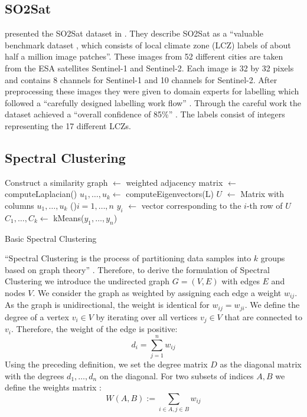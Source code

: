 \subsection{SO2Sat}
\label{subsec:so2sat}
\citeauthor{zhu_so2sat_2019} presented the SO2Sat dataset in \cite{zhu_so2sat_2019}.
They describe SO2Sat as a \enquote{valuable benchmark dataset \textelp{}, which consists of local climate zone (LCZ) labels of about half a million \textelp{} image patches}.
These images from 52 different cities are taken from the ESA satellites Sentinel-1 and Sentinel-2. Each image is 32 by 32 pixels and contains 8 channels for Sentinel-1 and 10 channels for Sentinel-2.
After preprocessing these images they were given to domain experts for labelling which followed a \enquote{carefully designed labelling work flow} \cite{zhu_so2sat_2019}.
Through the careful work the dataset achieved a \enquote{overall confidence of 85\%} \cite{zhu_so2sat_2019}.
The labels consist of integers representing the 17 different \glspl{LCZ}.

\subsection{Spectral Clustering}
\label{subsec:spectral_clustering}

\begin{algorithm}[b]
  Construct a similarity graph\;
  \Adj \(\leftarrow\) weighted adjacency matrix\;
  \Laplace \(\leftarrow\) computeLaplacian(\Adj)\;
  \(u_1, \ldots, u_k \leftarrow\) computeEigenvectors(L)\;
  \(U\) \(\leftarrow\) Matrix with columns \(u_1, \ldots, u_k\)\;
  \ForEach(){\(i = 1, \ldots, n\)}{
    \(y_i\) \(\leftarrow\) vector corresponding to the \(i\)-th row of \(U\)
  }
\(C_1, \ldots, C_k \leftarrow\) kMeans(\(y_1, \ldots, y_n\))\;

  \caption{Basic Spectral Clustering}\label{alg:basic_spectral}
 \end{algorithm}

\enquote{Spectral Clustering is the process of partitioning data samples into
\(k\) groups based on graph theory} \cite{krajsek_helmholtz_nodate}. Therefore,
to derive the formulation of Spectral Clustering we introduce the undirected graph \(G=(V, E)\) with edges \(E\) and nodes \(V\).
We consider the graph as weighted by assigning each edge a weight \(w_{ij}\). As the graph
is unidirectional, the weight is identical for \(w_{ij} = w_{ji} \).
We define the degree of a vertex \(v_i \in V\) by iterating over all vertices \(v_j \in V\) that are connected to \(v_i\).
Therefore, the weight of the edge is positive:
\[d_i = \sum_{j=1}^n w_{ij}\]
Using the preceding definition, we set the degree matrix \(D\) as the diagonal matrix with the degrees \(d_1, \ldots, d_n\) on the diagonal.
\cite{von_luxburg_tutorial_2007}
For two subsets of indices \(A, B\) we define the weights matrix \cite{von_luxburg_tutorial_2007}:
\[W(A, B) := \sum_{i \in A, j \in B} w_{ij}\]


